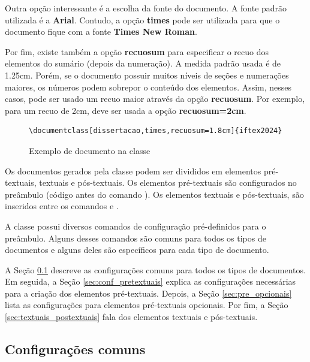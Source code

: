 \documentclass[artigo]{iftex2024}
\newcommand{\ElaboradoAutor}{Elaborado pelo autor, 2024.}
\begin{document}
Outra opção interessante é a escolha da fonte do documento.
A fonte padrão utilizada é a \textbf{Arial}.
Contudo, a opção \textbf{times} pode ser utilizada para que o documento fique com a fonte \textbf{Times New Roman}.

Por fim, existe também a opção \textbf{recuosum} para especificar o recuo dos elementos do sumário (depois da numeração).
A medida padrão usada é de 1.25cm.
Porém, se o documento possuir muitos níveis de seções e numerações maiores, os números podem sobrepor o conteúdo dos elementos.
Assim, nesses casos, pode ser usado um recuo maior através da opção \textbf{recuosum}.
Por exemplo, para um recuo de 2cm, deve ser usada a opção \textbf{recuosum=2cm}.

\begin{figure}[!htb] \centering
\caption{Exemplo de documento na classe \iftex} \label{fig:documento_iftex}
\begin{varwidth}{\linewidth}
\begin{verbatim}
\documentclass[dissertacao,times,recuosum=1.8cm]{iftex2024}
\end{verbatim}
\vspace{-1em}
\legend{\ElaboradoAutor}
\end{varwidth}
\end{figure}

Os documentos gerados pela classe {\iftex} podem ser divididos em elementos pré-textuais, textuais e pós-textuais.
Os elementos pré-textuais são configurados no preâmbulo (código antes do comando ).
Os elementos textuais e pós-textuais, são inseridos entre os comandos  e .

A classe {\iftex} possui diversos comandos de configuração pré-definidos para o preâmbulo.
Alguns desses comandos são comuns para todos os tipos de documentos e alguns deles são específicos para cada tipo de documento.

A Seção \ref{sec:conf_comuns} descreve as configurações comuns para todos os tipos de documentos.
Em seguida, a Seção \ref{sec:conf_pretextuais} explica as configurações necessárias para a criação dos elementos pré-textuais.
Depois, a Seção \ref{sec:pre_opcionais} lista as configurações para elementos pré-textuais opcionais.
Por fim, a Seção \ref{sec:textuais_postextuais} fala dos elementos textuais e pós-textuais.

\subsection{Configurações comuns} \label{sec:conf_comuns}
\end{document}
